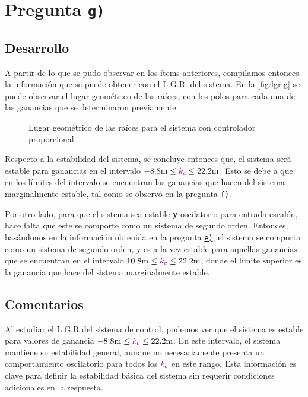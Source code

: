 \section{Pregunta \texttt{g)}}\label{pregunta-g}
\subsection{Desarrollo}

A partir de lo que se pudo observar en los ítems anteriores, compilamos entonces
la información que se puede obtener con el L.G.R. del sistema. En la \autoref{fig:lgr-g}
se puede observar el lugar geométrico de las raíces, con los polos para cada una
de las ganancias que se determinaron previamente.

\begin{figure}[ht]
  \centering
  
  \caption{Lugar geométrico de las raíces para el sistema con controlador proporcional.}
  \label{fig:lgr-g}
\end{figure}

Respecto a la estabilidad del sistema, se concluye entonces que, el sistema será
estable para ganancias en el intervalo $-8.8\unit{m} \leq \mora{k_{c}} \leq 22.2\unit{m}$.
Esto se debe a que en los límites del intervalo se encuentran las ganancias que
hacen del sistema marginalmente estable, tal como se observó en la pregunta
\hyperref[pregunta-f]{\texttt{f)}}.

Por otro lado, para que el sistema sea estable \textbf{y} oscilatorio para entrada
escalón, hace falta que este se comporte como un sistema de segundo orden. Entonces,
basándonos en la información obtenida en la pregunta \hyperref[pregunta-e]{\texttt{e)}},
el sistema se comporta como un sistema de segundo orden, y es a la vez estable para
aquellas ganancias que se encuentran en el intervalo $10.8\unit{m} \leq \mora{k_{c}} \leq 22.2\unit{m}$,
donde el límite superior es la ganancia que hace del sistema marginalmente estable.


\FloatBarrier
\subsection{Comentarios}


Al estudiar el L.G.R del sistema de control, podemos ver que el sistema es estable para valores de ganancia \( -8.8 \text{m} \leq \mathbin{\color{violet}k_c} \leq 22.2 \text{m} \). En este intervalo, el sistema mantiene su estabilidad general, aunque no necesariamente presenta un comportamiento oscilatorio para todos los \(\mathbin{\color{violet}k_c}\) en este rango. Esta información es clave para definir la estabilidad básica del sistema sin requerir condiciones adicionales en la respuesta.

